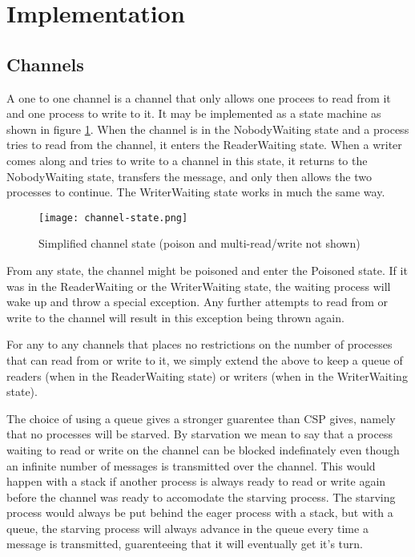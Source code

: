 \documentclass[a4paper,12pt]{article}
\begin{document}
\section{Implementation}
\label{implementation}


\subsection{Channels}
A one to one channel is a channel that only allows one procees to read from it and one process 
to write to it. It may be implemented as a state machine as shown in figure \ref{channel-state}.
When the channel is in the NobodyWaiting state and a process tries to read from the channel,
it enters the ReaderWaiting state. When a writer comes along and tries to write to a channel
in this state, it returns to the NobodyWaiting state, transfers the message, and only then
allows the two processes to continue. The WriterWaiting state works in much the same way.

\begin{figure}[h]
\centering
\texttt{[image: channel-state.png]}
\caption{Simplified channel state (poison and multi-read/write not shown)}
\label{channel-state}
\end{figure}

From any state, the channel might be poisoned and enter the Poisoned state. If it was in the
ReaderWaiting or the WriterWaiting state, the waiting process will wake up and throw a special
exception. Any further attempts to read from or write to the channel will result in this 
exception being thrown again.

For any to any channels that places no restrictions on the number of processes that can read
from or write to it, we simply extend the above to keep a queue of readers (when in the 
ReaderWaiting state) or writers (when in the WriterWaiting state).

The choice of using a queue gives a stronger guarentee than CSP gives, namely that no processes
will be starved. By starvation we mean to say that a process waiting to read or write on the
channel can be blocked indefinately even though an infinite number of messages is transmitted
over the channel. This would happen with a stack if another process is always ready to read or 
write again before the channel was ready to accomodate the starving process. The starving process
would always be put behind the eager process with a stack, but with a queue, the starving process
will always advance in the queue every time a message is transmitted, guarenteeing that it will
eventually get it's turn.
\end{document}
